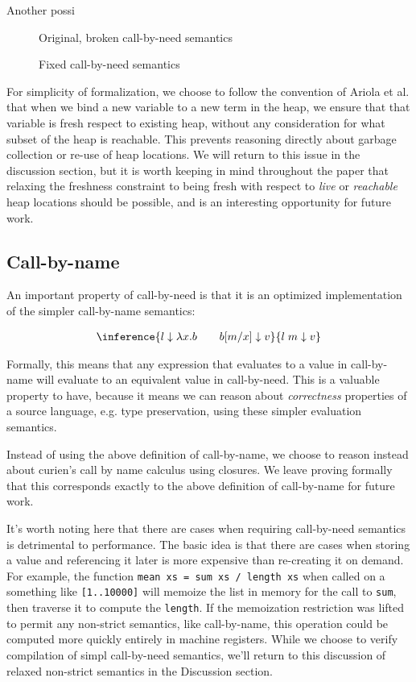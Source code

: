 Another possi
\begin{figure}

\caption{Original, broken call-by-need semantics}
\label{fig:cbnbroken}
\end{figure}

\begin{figure}

\caption{Fixed call-by-need semantics}
\label{fig:cbnfixed}
\end{figure}

For simplicity of formalization, we choose to follow the convention of Ariola et
al. that when we bind a new variable to a new term in the heap, we ensure that
that variable is fresh respect to existing heap, without any consideration for
what subset of the heap is reachable. This prevents reasoning directly about
garbage collection or re-use of heap locations. We will return to this issue in
the discussion section, but it is worth keeping in mind throughout the paper
that relaxing the freshness constraint to being fresh with respect to
\emph{live} or \emph{reachable} heap locations should be possible, and is an
interesting opportunity for future work. 

\subsection{Call-by-name}
An important property of call-by-need is that it is an optimized implementation of
the simpler call-by-name semantics: 

\begin{align}
\inference{l \downarrow \lambda x. b \quad \quad b [m / x] \downarrow v}{l \; m \downarrow v}
\end{align}

Formally, this means that any expression that evaluates to a value in
call-by-name will evaluate to an equivalent value in call-by-need. This is a
valuable property to have, because it means we can reason about
\emph{correctness} properties of a source language, e.g. type preservation,
using these simpler evaluation semantics. 

Instead of using the above definition of call-by-name, we choose to reason
instead about curien's call by name calculus using closures. We leave proving
formally that this corresponds exactly to the above definition of call-by-name
for future work.

It's worth noting here that there are cases when requiring call-by-need
semantics is detrimental to performance. The basic idea is that there are cases
when storing a value and referencing it later is more expensive than re-creating
it on demand. For example, the function \texttt{mean xs = sum xs / length xs}
when called on a something like \texttt{[1..10000]} will memoize the list in
memory for the call to \texttt{sum}, then traverse it to compute the
\texttt{length}.  If the memoization restriction was lifted to permit any
non-strict semantics, like call-by-name, this operation could be computed more
quickly entirely in machine registers. While we choose to verify compilation of
simpl call-by-need semantics, we'll return to this discussion of relaxed
non-strict semantics in the Discussion section.

